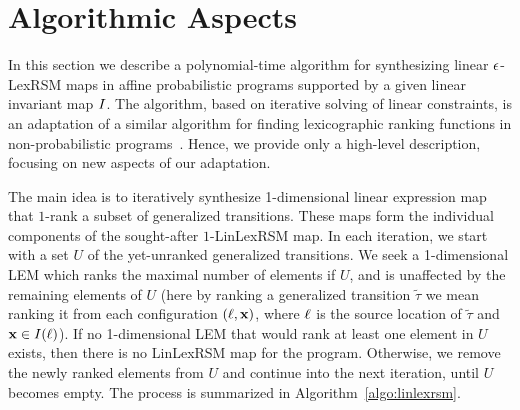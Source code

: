\section{Algorithmic Aspects}

In this section we describe a polynomial-time algorithm for synthesizing linear $\epsilon$-LexRSM maps in affine probabilistic programs supported by a given linear invariant map $I$. The algorithm, based on iterative solving of linear constraints, is an adaptation of a similar algorithm for finding lexicographic ranking functions in non-probabilistic programs~\cite{ADFG10:lexicographic}. Hence, we provide only a high-level description, focusing on new aspects of our adaptation. 

The main idea is to iteratively synthesize 1-dimensional linear expression map that $1$-rank a subset of generalized transitions. These maps form the individual components of the sought-after $1$-LinLexRSM map. In each iteration, we start with a set $U$ of the yet-unranked generalized transitions. We seek a 1-dimensional LEM which ranks the maximal number of elements if $U$, and is unaffected by the remaining elements of $U$ (here by ranking a generalized transition $\tilde\tau$ we mean ranking it from each configuration $(\ell,\mathbf{x})$, where $\ell$ is the source location of $\tilde\tau$ and $\mathbf{x}\in I(\ell)$). If no 1-dimensional LEM that would rank at least one element in $U$ exists, then there is no LinLexRSM map for the program. Otherwise, we remove the newly ranked elements from $U$ and continue into the next iteration, until $U$ becomes empty. The process is summarized in Algorithm~\ref{algo:linlexrsm}.

